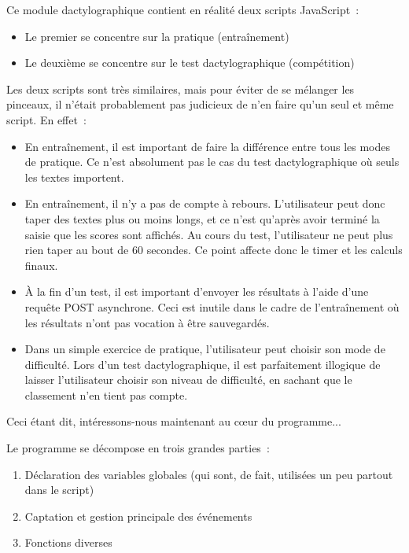 \documentclass[a4paper,12pt]{article}
\begin{document}
Ce module dactylographique contient en réalité deux scripts JavaScript~:

\begin{itemize}
 \item{Le premier se concentre sur la pratique (entraînement)}
 \item{Le deuxième se concentre sur le test dactylographique (compétition)}
\end{itemize}

Les deux scripts sont très similaires, mais pour éviter de se mélanger les pinceaux, il n'était probablement pas judicieux de n'en faire qu'un seul et même script. En effet~:

\begin{itemize}
 \item{En entraînement, il est important de faire la différence entre tous les modes de pratique. Ce n'est absolument pas le cas du test dactylographique où seuls les textes importent.\\}
 \item{En entraînement, il n'y a pas de compte à rebours. L'utilisateur peut donc taper des textes plus ou moins longs, et ce n'est qu'après avoir terminé la saisie que les scores sont affichés. Au cours du test, l'utilisateur ne peut plus rien taper au bout de 60 secondes. Ce point affecte donc le timer et les calculs finaux.\\}
 \item{À la fin d'un test, il est important d'envoyer les résultats à l'aide d'une requête POST asynchrone. Ceci est inutile dans le cadre de l'entraînement où les résultats n'ont pas vocation à être sauvegardés.\\}
 \item{Dans un simple exercice de pratique, l'utilisateur peut choisir son mode de difficulté. Lors d'un test dactylographique, il est parfaitement illogique de laisser l'utilisateur choisir son niveau de difficulté, en sachant que le classement n'en tient pas compte.}
\end{itemize}

Ceci étant dit, intéressons-nous maintenant au cœur du programme...

Le programme se décompose en trois grandes parties~:

\begin{enumerate}
 \item{Déclaration des variables globales (qui sont, de fait, utilisées un peu partout dans le script)}
 \item{Captation et gestion principale des événements}
 \item{Fonctions diverses}
\end{enumerate}
\end{document}
